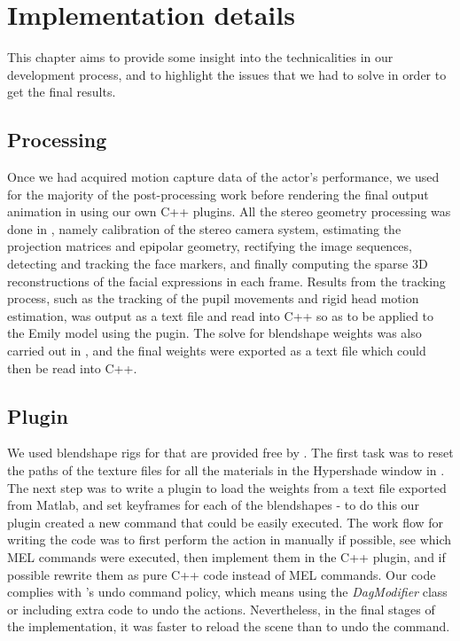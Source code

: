 \chapter{Implementation details}
\label{ch:implementation_details}

This chapter aims to provide some insight into the technicalities in our development process, and to highlight the issues that we had to solve in order to get the final results. 

\section{\Matlab Processing}

Once we had acquired motion capture data of the actor's performance, we used \Matlab for the majority of the post-processing work before rendering the final output animation in \Maya using our own C++ plugins. All the stereo geometry processing was done in \Matlab, namely calibration of the stereo camera system, estimating the projection matrices and epipolar geometry, rectifying the image sequences, detecting and tracking the face markers, and finally computing the sparse 3D reconstructions of the facial expressions in each frame. Results from the tracking process, such as the tracking of the pupil movements and rigid head motion estimation, was output as a text file and read into C++ so as to be applied to the Emily model using the \Maya pugin. The solve for blendshape weights was also carried out in \Matlab, and the final weights were exported as a text file which could then be read into C++. 

\section{\Maya Plugin}
\label{sec:maya_plugin}

We used blendshape rigs for \Maya that are provided free by \cite{FaceWareRigsWeb}. The first task was to reset the paths of the texture files for all the materials in the Hypershade window in \Maya.
The next step was to write a plugin to load the weights from a text file exported from Matlab, and set keyframes for each of the blendshapes - to do this our plugin created a new \Maya command that could be easily executed. 
The work flow for writing the code was to first perform the action in \Maya manually if possible, see which MEL commands were executed, then implement them in the C++ plugin, and if possible rewrite them as pure C++ code instead of MEL commands.
Our code complies with \Maya's undo command policy, which means using the \emph{DagModifier} class or including extra code to undo the actions.
Nevertheless, in the final stages of the implementation, it was faster to reload the scene than to undo the command.

